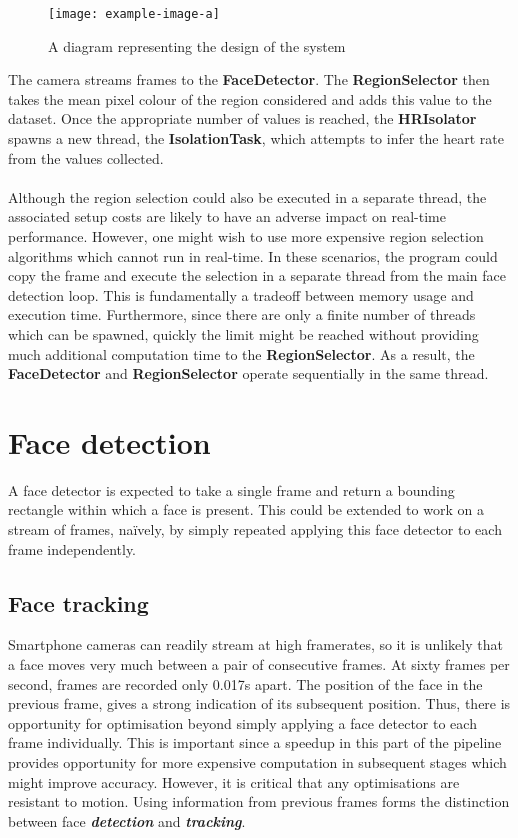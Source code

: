 \begin{figure}[!h]
    \texttt{[image: example-image-a]}
   \caption{A diagram representing the design of the system} 
\end{figure}
\noindent
The camera streams frames to the \textbf{FaceDetector}. The \textbf{RegionSelector} then takes the mean pixel colour of the region considered and adds this value to the dataset. Once the appropriate number of values is reached, the \textbf{HRIsolator} spawns a new thread, the \textbf{IsolationTask}, which attempts to infer the heart rate from the values collected. 
\\ \\
Although the region selection could also be executed in a separate thread, the associated setup costs are likely to have an adverse impact on real-time performance. However, one might wish to use more expensive region selection algorithms which cannot run in real-time. In these scenarios, the program could copy the frame and execute the selection in a separate thread from the main face detection loop. This is fundamentally a tradeoff between memory usage and execution time. Furthermore, since there are only a finite number of threads which can be spawned, quickly the limit might be reached without providing much additional computation time to the \textbf{RegionSelector}. As a result, the \textbf{FaceDetector} and \textbf{RegionSelector} operate sequentially in the same thread.
\section{Face detection}
A face detector is expected to take a single frame and return a bounding rectangle within which a face is present. This could be extended to work on a stream of frames, naïvely, by simply repeated applying this face detector to each frame independently.

\subsection{Face tracking}
Smartphone cameras can readily stream at high framerates, so it is unlikely that a face moves very much between a pair of consecutive frames. At sixty frames per second, frames are recorded only 0.017s apart. The position of the face in the previous frame, gives a strong indication of its subsequent position. Thus, there is opportunity for optimisation beyond simply applying a face detector to each frame individually. This is important since a speedup in this part of the pipeline provides opportunity for more expensive computation in subsequent stages which might improve accuracy. However, it is critical that any optimisations are resistant to motion. Using information from previous frames forms the distinction between face \textbf{\textit{detection}} and \textbf{\textit{tracking}}.

